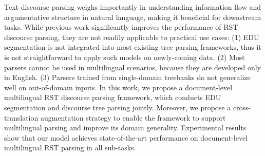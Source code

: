Text discourse parsing weighs importantly in understanding information flow and argumentative structure in natural language, making it beneficial for downstream tasks. While previous work significantly improves the performance of RST discourse parsing, they are not readily applicable to practical use cases: (1) EDU segmentation is not integrated into most existing tree parsing frameworks, thus it is not straightforward to apply such models on newly-coming data. (2) Most parsers cannot be used in multilingual scenarios, because they are developed only in English. (3) Parsers trained from single-domain treebanks do not generalize well on out-of-domain inputs. In this work, we propose a document-level multilingual RST discourse parsing framework, which conducts EDU segmentation and discourse tree parsing jointly. Moreover, we propose a cross-translation augmentation strategy to enable the framework to support multilingual parsing and improve its domain generality. Experimental results show that our model achieves state-of-the-art performance on document-level multilingual RST parsing in all sub-tasks.
